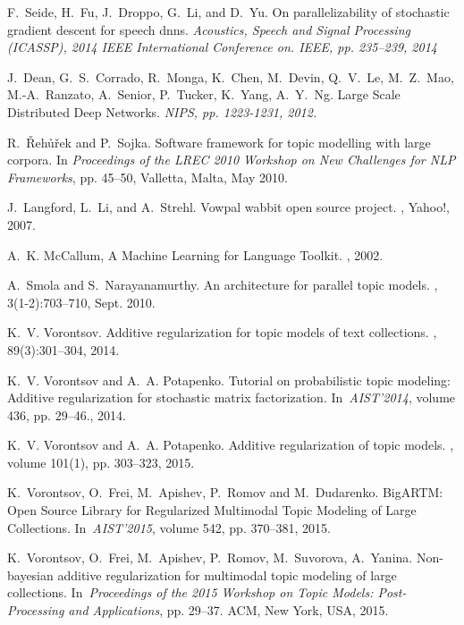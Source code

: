 \documentclass[russian,english]{llncs}
\begin{document}
\begin{thebibliography}{10}
F.~Seide, H.~Fu, J.~Droppo, G.~Li, and D.~Yu.
\newblock On parallelizability of stochastic gradient descent for speech dnns.
\newblock \em{Acoustics, Speech and Signal Processing (ICASSP), 2014 IEEE International Conference on. IEEE}, pp. 235–239, 2014

J.~Dean, G.~S.~Corrado, R.~Monga, K.~Chen, M.~Devin, Q.~V.~Le, M.~Z.~Mao, M.-A.~Ranzato, A.~Senior, P.~Tucker, K.~Yang, A.~Y.~Ng.
\newblock Large Scale Distributed Deep Networks.
\newblock \em{NIPS}, pp. 1223-1231, 2012.

R.~\v{R}eh\r{u}\v{r}ek and P.~Sojka.
\newblock Software framework for topic modelling with large corpora.
\newblock In {\em Proceedings of the {LREC} 2010 Workshop on New Challenges for
	{NLP} Frameworks}, pp. 45--50, Valletta, Malta, May 2010.


J.~Langford, L.~Li, and A.~Strehl.
\newblock Vowpal wabbit open source project.
, Yahoo!, 2007.

A.~K. McCallum,
\newblock A Machine Learning for Language Toolkit.
, 2002.
   
A.~Smola and S.~Narayanamurthy.
\newblock An architecture for parallel topic models.
, 3(1-2):703--710, Sept. 2010.

K.~V. Vorontsov.
\newblock Additive regularization for topic models of text collections.
, 89(3):301--304, 2014.

K.~V. Vorontsov and A.~A. Potapenko.
\newblock Tutorial on probabilistic topic modeling: Additive regularization for stochastic matrix factorization.
\newblock In~{\em AIST'2014}, volume 436, pp. 29--46., 2014.

K.~V. Vorontsov and A.~A. Potapenko.
\newblock Additive regularization of topic models.
, volume 101(1), pp. 303--323, 2015.

K.~Vorontsov, O.~Frei, M.~Apishev, P.~Romov and M.~Dudarenko.
\newblock BigARTM: Open Source Library for Regularized Multimodal Topic Modeling of Large Collections.
\newblock In~{\em AIST'2015}, volume 542, pp. 370--381, 2015.

K.~Vorontsov, O.~Frei, M.~Apishev, P.~Romov, M.~Suvorova, A.~Yanina.
\newblock Non-bayesian additive regularization for multimodal topic modeling of large
collections.
\newblock In~{\em Proceedings of the 2015 Workshop on Topic Models:
Post-Processing and Applications}, pp. 29--37. ACM, New York, USA, 2015.

\end{thebibliography}
\end{document}
